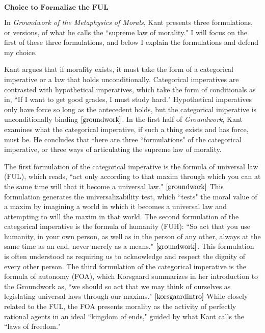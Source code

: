 %
\begin{isabellebody}%
%
%
\isadelimtheory
%
\endisadelimtheory
%
\isatagtheory
%
\endisatagtheory
{\isafoldtheory}%
%
\isadelimtheory
%
\endisadelimtheory
%
\begin{isamarkuptext}%
$\textbf{Choice to Formalize the FUL}$

In \emph{Groundwork of the Metaphysics of Morals}, Kant presents three formulations, or versions, 
of what he calls the ``supreme law of morality." I will focus on the first of these three formulations, 
and below I explain the formulations and defend my choice.

Kant argues that if  morality 
exists, it must take the form of a categorical imperative or a law that holds unconditionally. Categorical
imperatives are contrasted with hypothetical imperatives, which take the form of conditionals as in, 
``If I want to get good grades, I must study hard." Hypothetical imperatives only have force so long
as the antecedent holds, but the categorical imperative is unconditionally binding $\cite[28]{groundwork}$. In the first 
half of \emph{Groundwork}, Kant examines what the categorical imperative, if such a thing exists and has force,
must be. He concludes that there are three ``formulations" of the categorical imperative, or three ways 
of articulating the supreme law of morality. 

The first formulation of the categorical imperative is the
formula of universal law (FUL), which reads, ``act only according to that maxim through which you can 
at the same time will that it become a universal law." $\cite[34]{groundwork}$ This formulation
generates the universalizability test, which ``tests" the moral value of a maxim by 
imagining a world in which it becomes a universal law and attempting to will the maxim in that world. The 
second formulation of the categorical imperative is the formula of humanity (FUH): ``So act that you use humanity, 
in your own person, as well as in the person of any other, always at the same time as an end, never merely 
as a means." $\cite[41]{groundwork}$. This formulation is often understood as requiring us to 
acknowledge and respect the dignity of every other person. The third formulation of the categorical 
imperative is the formula of autonomy (FOA), which Korsgaard summarizes in her introduction to the Groundwork 
as, ``we should so act that we may think of ourselves as legislating universal laws through our 
maxims." $\cite[28]{korsgaardintro}$ While closely related to the FUL, the FOA presents morality as the activity of 
perfectly rational agents in an ideal ``kingdom of ends," guided by what Kant calls the ``laws of freedom."


\end{isamarkuptext}
\end{isabellebody}
